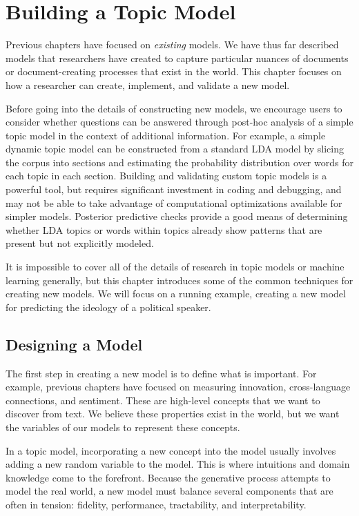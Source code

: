 \chapter{Building a Topic Model}
\label{ch:building}

Previous chapters have focused on \emph{existing} models.  
We have thus far described
models that researchers have created to capture particular nuances of documents or
document-creating processes that exist in the world.
This chapter focuses on how a researcher can create, implement, and
validate a new model. 

Before going into the details of constructing new models, we encourage users to consider whether questions can be answered through post-hoc analysis of a simple topic model in the context of additional information.
For example, a simple dynamic topic model can be constructed from a standard LDA model by slicing the corpus into sections and estimating the probability distribution over words for each topic in each section.
Building and validating custom topic models is a powerful tool, but requires significant investment in coding and debugging, and may not be able to take advantage of computational optimizations available for simpler models.
Posterior predictive checks \citep{mimno-11Bayesian} provide a good means of determining whether LDA topics or words within topics already show patterns that are present but not explicitly modeled.

It is impossible to cover all of the details of research in topic
models or machine learning generally, but this chapter introduces some
of the common techniques for creating new models.  We will focus on a
running example, creating a new model for predicting the
ideology of a political speaker.

\section{Designing a Model}

The first step in creating a new model is to define what is
important.  For example, previous chapters have focused on measuring
innovation, cross-language connections, and sentiment.  These are
high-level concepts that we want to discover from text.  We believe
these properties exist in the world, but we want the variables of our models to represent
these concepts.

In a topic model, incorporating a new concept into the model usually
involves adding a new random variable to the model.  This is where
intuitions and domain knowledge come to the forefront.  Because the
generative process attempts to model the real world, a new model must
balance several components that are often in tension: fidelity,
performance, tractability, and interpretability.

